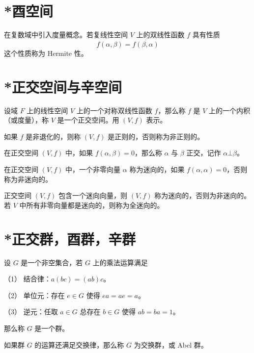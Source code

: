 \section{*酉空间}

在复数域中引入度量概念。若复线性空间 $V$ 上的双线性函数 $f$ 具有性质
\[ f(\alpha,\beta) = \overline{f(\beta,\alpha)} \]
这个性质称为 Hermite 性。

\section{*正交空间与辛空间}

\begin{definition}
    设域 $F$ 上的线性空间 $V$ 上的一个对称双线性函数 $f$，那么称 $f$ 是 $V$ 上的一个内积（或度量），称 $V$ 是一个正交空间。用 $(V,f)$ 表示。
\end{definition}

如果 $f$ 是非退化的，则称 $(V,f)$ 是正则的，否则称为非正则的。

\begin{definition}
    在正交空间 $(V,f)$ 中，如果 $f(\alpha,\beta) = 0$，那么称 $\alpha$ 与 $\beta$ 正交，记作 $\alpha \bot \beta$。
\end{definition}

在正交空间 $(V,f)$ 中，一个非零向量 $\alpha$ 称为迷向的，如果 $f(\alpha,\alpha) = 0$，否则称为非迷向的。

正交空间 $(V,f)$ 包含一个迷向向量，则 $(V,f)$ 称为迷向的，否则为非迷向的。若 $V$ 中所有非零向量都是迷向的，则称为全迷向的。

\section{*正交群，酉群，辛群}

\begin{definition}
    设 $G$ 是一个非空集合，若 $G$ 上的乘法运算满足
    
    （1） 结合律：$a(bc) = (ab)c$。
    
    （2） 单位元：存在 $e \in G$ 使得 $ea = ae = a$。
    
    （3） 逆元：任取 $a \in G$ 总存在 $b \in G$ 使得 $ab = ba = 1$。
    
    那么称 $G$ 是一个群。
\end{definition}

如果群 $G$ 的运算还满足交换律，那么称 $G$ 为交换群，或 Abel 群。











